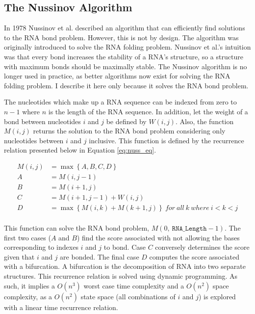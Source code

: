 \documentclass[12pt, a4paper]{article}
\begin{document}
\subsection{The Nussinov Algorithm}
In 1978 Nussinov et al. \cite{nussinov1978algorithms} described an algorithm that can efficiently find solutions to the RNA bond problem. However, this is not by design. The algorithm was originally introduced to solve the RNA folding problem. Nussinov et al.'s intuition was that every bond increases the stability of a RNA's structure, so a structure with maximum bonds should be maximally stable. The Nussinov algorithm is no longer used in practice, as better algorithms now exist for solving the RNA folding problem. I describe it here only because it solves the RNA bond problem.

The nucleotides which make up a RNA sequence can be indexed from zero to $n-1$ where $n$ is the length of the RNA sequence. In addition, let the weight of a bond between nucleotides $i$ and $j$ be defined by $W(i,j)$. Also, the function $M(i,j)$ returns the solution to the RNA bond problem considering only nucleotides between $i$ and $j$ inclusive. This function is defined by the recurrence relation presented below in Equation \ref{eq:nuss_eq}.

\begin{align} \label{eq:nuss_eq}
	M(i, j) &= \max \left\lbrace A, B, C, D \right\rbrace \nonumber  \\
	A &= M(i, j-1) \nonumber \\
	B &= M(i+1, j) \nonumber \\
	C &= M(i+1, j-1) + W(i, j) \nonumber \\
	D &= \max \left\lbrace M(i, k) + M(k+1, j) \right\rbrace \: for \: all \: k \: where \: i < k < j \nonumber	\\
\end{align}

This function can solve the RNA bond problem, $M(0, \ \texttt{RNA\_Length}-1)$. The first two cases ($A$ and $B$) find the score associated with not allowing the bases corresponding to indexes $i$ and $j$ to bond. Case $C$ conversely determines the score given that $i$ and $j$ are bonded. The final case $D$ computes the score associated with a bifurcation. A bifurcation is the decomposition of RNA into two separate structures. This recurrence relation is solved using dynamic programming. As such, it implies a $O(n^3)$
worst case time complexity and a $O(n^2)$ space complexity, as a $O(n^2)$ state space (all combinations of $i$ and $j$) is explored
with a linear time recurrence relation.
\end{document}
